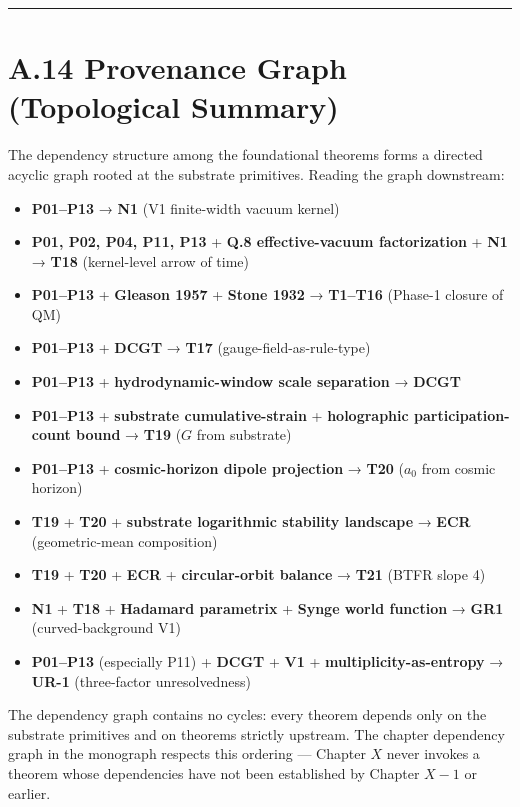 \documentclass[11pt]{book}
\begin{document}
\bigskip\hrule\bigskip

\section{A.14 Provenance Graph (Topological Summary)}

The dependency structure among the foundational theorems forms a directed acyclic graph rooted at the substrate primitives. Reading the graph downstream:

\begin{itemize}
\item \textbf{P01–P13} → \textbf{N1} (V1 finite-width vacuum kernel)
\item \textbf{P01, P02, P04, P11, P13} + \textbf{Q.8 effective-vacuum factorization} + \textbf{N1} → \textbf{T18} (kernel-level arrow of time)
\item \textbf{P01–P13} + \textbf{Gleason 1957} + \textbf{Stone 1932} → \textbf{T1–T16} (Phase-1 closure of QM)
\item \textbf{P01–P13} + \textbf{DCGT} → \textbf{T17} (gauge-field-as-rule-type)
\item \textbf{P01–P13} + \textbf{hydrodynamic-window scale separation} → \textbf{DCGT}
\item \textbf{P01–P13} + \textbf{substrate cumulative-strain} + \textbf{holographic participation-count bound} → \textbf{T19} ($G$ from substrate)
\item \textbf{P01–P13} + \textbf{cosmic-horizon dipole projection} → \textbf{T20} ($a_0$ from cosmic horizon)
\item \textbf{T19} + \textbf{T20} + \textbf{substrate logarithmic stability landscape} → \textbf{ECR} (geometric-mean composition)
\item \textbf{T19} + \textbf{T20} + \textbf{ECR} + \textbf{circular-orbit balance} → \textbf{T21} (BTFR slope 4)
\item \textbf{N1} + \textbf{T18} + \textbf{Hadamard parametrix} + \textbf{Synge world function} → \textbf{GR1} (curved-background V1)
\item \textbf{P01–P13} (especially P11) + \textbf{DCGT} + \textbf{V1} + \textbf{multiplicity-as-entropy} → \textbf{UR-1} (three-factor unresolvedness)
\end{itemize}

The dependency graph contains no cycles: every theorem depends only on the substrate primitives and on theorems strictly upstream. The chapter dependency graph in the monograph respects this ordering — Chapter $X$ never invokes a theorem whose dependencies have not been established by Chapter $X-1$ or earlier.
\end{document}

